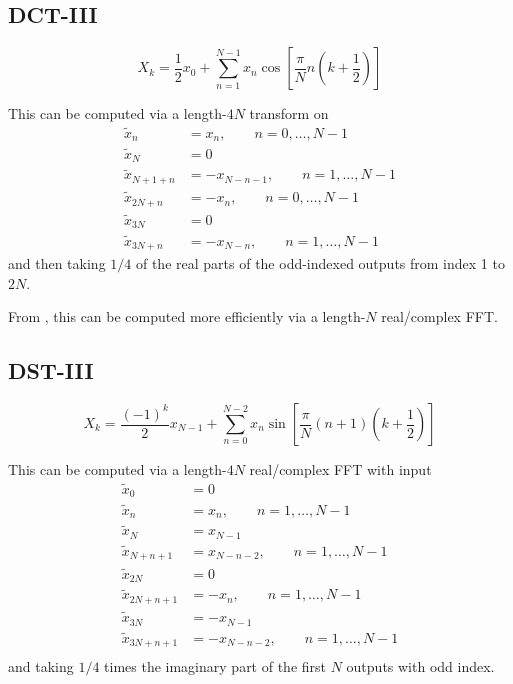 \documentclass[12pt]{article}
\renewcommand{\(}{\left(}
\renewcommand{\)}{\right)}
\begin{document}
\subsection{DCT-III}

\begin{dmath}
  X_k = \frac{1}{2}x_0
  +\sum_{n=1}^{N-1}x_n \cos\left[\frac{\pi}{N}n\(k+\frac{1}{2}\)\right]
\end{dmath}

This can be computed via a length-$4N$ transform on
\begin{align}
  \tilde{x}_n &= x_n, \qquad n = 0,\dots, N-1 \\
  \tilde{x}_N &= 0\\
  \tilde{x}_{N+1+n} &= -x_{N - n - 1}, \qquad n = 1,\dots, N-1 \\
  \tilde{x}_{2 N + n} &= -x_n, \qquad n = 0,\dots, N-1 \\
  \tilde{x}_{3N} &= 0\\
  \tilde{x}_{3 N + n} &= -x_{N-n}, \qquad n = 1,\dots, N-1
\end{align}
and then taking $1/4$ of the real parts of the odd-indexed outputs
from index 1 to $2N$.

From \cite{shaojohnsondst23}, this can be computed more efficiently
via a length-$N$ real/complex FFT.


\subsection{DST-III}

\begin{dmath}
  X_k = \frac{\(-1\)^k }{2} x_{N-1}
  +\sum_{n=0}^{N-2}x_n \sin\left[\frac{\pi}{N}\(n+1\)\(k+\frac{1}{2}\)\right]
\end{dmath}

This can be computed via a length-$4N$ real/complex FFT with input
\begin{align}
  \tilde{x}_0 &= 0\\
  \tilde{x}_n &= x_n, \qquad n = 1,\dots, N-1 \\
  \tilde{x}_N &= x_{N-1}\\
  \tilde{x}_{N + n + 1} &= x_{N - n - 2}, \qquad n = 1,\dots, N-1 \\
  \tilde{x}_{2N} &= 0\\
  \tilde{x}_{2 N + n + 1} &= -x_n, \qquad n = 1,\dots, N-1 \\
  \tilde{x}_{3N} &= -x_{N-1}\\
  \tilde{x}_{3 N + n + 1} &= -x_{N - n - 2}, \qquad n = 1,\dots, N-1 \\
\end{align}
and taking $1/4$ times the imaginary part of the first $N$ outputs
with odd index.
\end{document}
